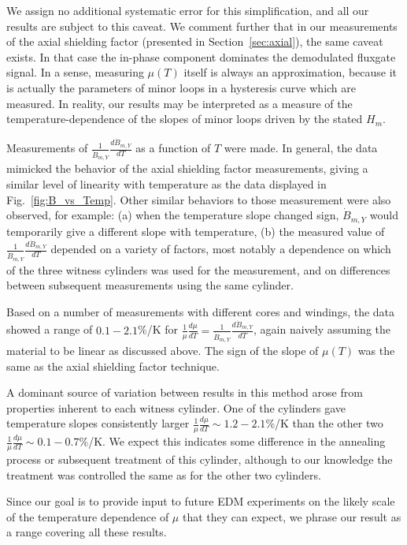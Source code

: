 We assign no additional systematic error for this simplification, and
all our results are subject to this caveat.  We comment further that
in our measurements of the axial shielding factor (presented in
Section~\ref{sec:axial}), the same caveat exists.  In that case the
in-phase component dominates the demodulated fluxgate signal.  In a
sense, measuring $\mu(T)$ itself is always an approximation, because
it is actually the parameters of minor loops in a hysteresis curve
which are measured.  In reality, our results may be interpreted as a
measure of the temperature-dependence of the slopes of minor loops
driven by the stated $H_m$.

Measurements of $\frac{1}{\dot{B}_{m,Y}}\frac{d\dot{B}_{m,Y}}{dT}$ as
a function of $T$ were made.  In general, the data mimicked the
behavior of the axial shielding factor measurements, giving a similar
level of linearity with temperature as the data displayed in
Fig.~\ref{fig:B_vs_Temp}.  Other similar behaviors to those
measurement were also observed, for example: (a) when the temperature
slope changed sign, $\dot{B}_{m,Y}$ would temporarily give a different
slope with temperature, (b) the measured value of
$\frac{1}{\dot{B}_{m,Y}}\frac{d\dot{B}_{m,Y}}{dT}$ depended on a
variety of factors, most notably a dependence on which of the three
witness cylinders was used for the measurement, and on differences
between subsequent measurements using the same cylinder.

Based on a number of measurements with different cores and windings,
the data showed a range of $0.1-2.1$\%/K for
$\frac{1}{\mu}\frac{d\mu}{dT}=\frac{1}{\dot{B}_{m,Y}}\frac{d\dot{B}_{m,Y}}{dT}$,
again naively assuming the material to be linear as discussed above.
The sign of the slope of $\mu(T)$ was the same as the axial shielding
factor technique.

A dominant source of variation between results in this method arose
from properties inherent to each witness cylinder.  One of the
cylinders gave temperature slopes consistently larger
$\frac{1}{\mu}\frac{d\mu}{dT}\sim 1.2-2.1$\%/K than the other two
$\frac{1}{\mu}\frac{d\mu}{dT}\sim 0.1-0.7$\%/K.  We expect this
indicates some difference in the annealing process or subsequent
treatment of this cylinder, although to our knowledge the treatment
was controlled the same as for the other two cylinders.

Since our goal is to provide input to future EDM experiments on the
likely scale of the temperature dependence of $\mu$ that they can
expect, we phrase our result as a range covering all these results.

